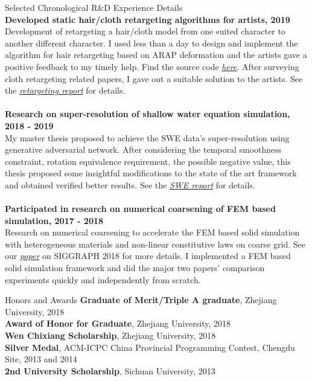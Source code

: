 \documentclass{resume} %
\begin{document}
\begin{rSection}{Selected Chronological R\&D Experience Details}
  \\{\bf Developed static hair/cloth retargeting algorithms for artists, 2019}\\ Development of retargeting a hair/cloth model from one suited character to another different character. I used less than a day to design and implement the algorithm for hair retargeting based on ARAP deformation and the artists gave a positive feedback to my timely help. Find the source code \emph{\href{https://github.com/WTYatzoo/hair\_retargeting}{here}}. After surveying cloth retargeting related papers, I gave out a suitable solution to the artists. See the \emph{\href{https://wtyatzoo.github.io/reports/retargeting.pdf}{retargeting report}} for details.\\
  \\{\bf Research on super-resolution of shallow water equation simulation, 2018 - 2019}\\ My master thesis proposed to achieve the SWE data's super-resolution using generative adversarial network. After considering the temporal smoothness constraint, rotation equivalence requirement, the possible negative value, this thesis proposed some insightful modifications to the state of the art framework and obtained verified better results. See the \emph{\href{https://wtyatzoo.github.io/reports/SWE.pdf}{SWE report}} for details. \\
  \\{\bf Participated in research on numerical coarsening of FEM based simulation, 2017 - 2018}\\ Research on numerical coarsening to accelerate the FEM based solid simulation with heterogeneous materials and non-linear constitutive laws on coarse grid. See our \emph{\href{https://wtyatzoo.github.io/peer\_reviewed/opt\_basis\_18.pdf}{paper}} on SIGGRAPH 2018 for more details. I implemented a FEM based solid simulation framework and did the major two papers' comparison experiments quickly and independently from scratch.\\
\end{rSection}

\begin{rSection}{Honors and Awards}
  \textbf{Graduate of Merit/Triple A graduate}, Zhejiang University, 2018\\
  \textbf{Award of Honor for Graduate}, Zhejiang University, 2018\\
  \textbf{Wen Chixiang Scholarship}, Zhejiang University, 2018\\
  \textbf{Silver Medal}, ACM-ICPC China Provincial Programming Contest, Chengdu Site, 2013 and 2014\\
  \textbf{2nd University Scholarship}, Sichuan University, 2013
\end{rSection}
\end{document}
